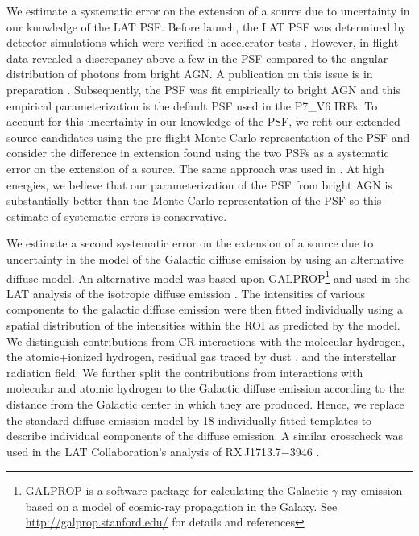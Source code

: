 \documentclass[12pt,preprint]{aastex}
\newcommand{\gev}{\text{GeV}\xspace}
\begin{document}

We estimate a systematic error on the extension of a source due to
uncertainty in our knowledge of the LAT PSF.  Before launch, the LAT
PSF was determined by detector simulations which were verified in
accelerator tests \citep{atwood_LAT_mission}. However, in-flight data
revealed a discrepancy above a few \gev in the PSF compared to the 
angular distribution of photons from bright AGN.  A publication on this issue is in
preparation \citep{lat_on_orbit_psf}.  Subsequently, the PSF was fit
empirically to bright AGN and this empirical parameterization is the
default PSF used in the P7\_V6 IRFs.  To account for this uncertainty in
our knowledge of the PSF, we refit our extended source candidates using
the pre-flight Monte Carlo representation of the PSF and consider the difference
in extension found using the two PSFs as a systematic error on the
extension of a source.  The same approach was used in \citep{ic443}.
At high energies, we believe that our parameterization of the PSF from
bright AGN is substantially better than the Monte Carlo representation
of the PSF so this estimate of systematic errors is conservative.


We estimate a second systematic error on the extension of a source
due to uncertainty in the model of the Galactic diffuse emission by
using an alternative diffuse model. An alternative model was based
upon GALPROP\footnote{GALPROP is a software package for calculating the
Galactic $\gamma$-ray emission based on a model of cosmic-ray propagation
in the Galaxy. See \url{http://galprop.stanford.edu/} for details
and references} and used in the LAT analysis of the isotropic diffuse
emission \citep{isotropic_lat}.  The intensities of various components
to the galactic diffuse emission were then fitted individually using a
spatial distribution of the intensities within the ROI as predicted by
the model.  We distinguish contributions from CR interactions with the
molecular hydrogen, the atomic+ionized hydrogen, residual gas traced
by dust \citep{isabelle_dark_gass}, and the interstellar radiation
field. We further split the contributions from interactions with molecular
and atomic hydrogen to the Galactic diffuse emission according to the
distance from the Galactic center in which they are produced. Hence, we
replace the standard diffuse emission model by 18 individually fitted
templates to describe individual components of the diffuse emission.
A similar crosscheck was used in the LAT Collaboration's analysis of 
RX\,J1713.7$-$3946 \citep{rx_j1713_lat}.
\end{document}
